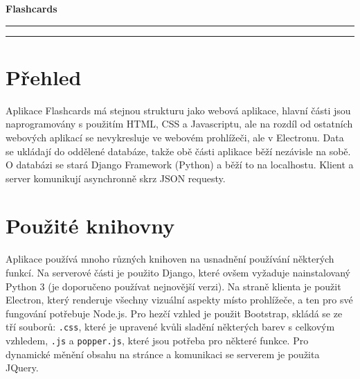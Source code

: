 \documentclass[11pt]{article}
\let\oldtexttt\texttt
\renewcommand{\texttt}[1]{\oldtexttt{\textcolor{codehighlight}{#1}}}
\begin{document}
\begin{center}
  \textbf{\Huge Flashcards}\\
  \vspace{0.2cm}
  \rule{\textwidth}{0.5pt}
\end{center}
\tableofcontents
\begin{center}
  \rule{\textwidth}{0.5pt}
\end{center}
\hypertarget{pux159ehled}{%
\section{Přehled}\label{pux159ehled}}

Aplikace Flashcards má stejnou strukturu jako webová aplikace, hlavní
části jsou naprogramovány s použitím HTML, CSS a Javascriptu, ale na
rozdíl od ostatních webových aplikací se nevykresluje ve webovém
prohlížeči, ale v Electronu. Data se ukládají do oddělené databáze,
takže obě části aplikace běží nezávisle na sobě. O databázi se stará
Django Framework (Python) a běží to na localhostu. Klient a server
komunikují asynchronně skrz JSON requesty.

\hypertarget{pouux17eituxe9-knihovny}{%
\section{Použité knihovny}\label{pouux17eituxe9-knihovny}}

Aplikace používá mnoho různých knihoven na usnadnění používání některých
funkcí. Na serverové části je použito Django, které ovšem vyžaduje
nainstalovaný Python 3 (je doporučeno používat nejnovější verzi). Na
straně klienta je použit Electron, který renderuje všechny vizuální
aspekty místo prohlížeče, a ten pro své fungování potřebuje Node.js. Pro
hezčí vzhled je použit Bootstrap, skládá se ze tří souborů:
\texttt{.css}, které je upravené kvůli sladění některých barev s
celkovým vzhledem, \texttt{.js} a \texttt{popper.js}, které jsou potřeba
pro některé funkce. Pro dynamické měnění obsahu na stránce a komunikaci
se serverem je použita JQuery.
\end{document}
